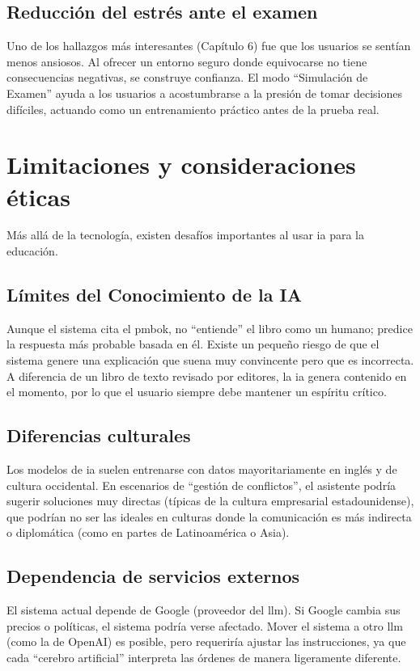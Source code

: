 \subsection{Reducción del estrés ante el examen}
Uno de los hallazgos más interesantes (Capítulo 6) fue que los usuarios se sentían menos ansiosos. Al ofrecer un entorno seguro donde equivocarse no tiene consecuencias negativas, se construye confianza. El modo \enquote{Simulación de Examen} ayuda a los usuarios a acostumbrarse a la presión de tomar decisiones difíciles, actuando como un entrenamiento práctico antes de la prueba real.

\section{Limitaciones y consideraciones éticas}

Más allá de la tecnología, existen desafíos importantes al usar \gls{ia} para la educación.

\subsection{Límites del Conocimiento de la IA}
Aunque el sistema cita el \gls{pmbok}, no \enquote{entiende} el libro como un humano; predice la respuesta más probable basada en él. Existe un pequeño riesgo de que el sistema genere una explicación que suena muy convincente pero que es incorrecta. A diferencia de un libro de texto revisado por editores, la \gls{ia} genera contenido en el momento, por lo que el usuario siempre debe mantener un espíritu crítico.

\subsection{Diferencias culturales}
Los modelos de \gls{ia} suelen entrenarse con datos mayoritariamente en inglés y de cultura occidental. En escenarios de \enquote{gestión de conflictos}, el asistente podría sugerir soluciones muy directas (típicas de la cultura empresarial estadounidense), que podrían no ser las ideales en culturas donde la comunicación es más indirecta o diplomática (como en partes de Latinoamérica o Asia).

\subsection{Dependencia de servicios externos}
El sistema actual depende de Google (proveedor del \gls{llm}). Si Google cambia sus precios o políticas, el sistema podría verse afectado. Mover el sistema a otro \gls{llm} (como la de OpenAI) es posible, pero requeriría ajustar las instrucciones, ya que cada \enquote{cerebro artificial} interpreta las órdenes de manera ligeramente diferente.

